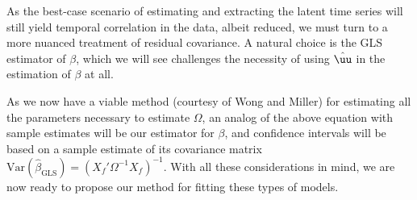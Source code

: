 As the best-case scenario of estimating and extracting the latent time series will still yield temporal correlation in the data, albeit reduced, we must turn to a more nuanced treatment of residual covariance. A natural choice is the GLS estimator of $\beta$, which we will see challenges the necessity of using $\hat{\uu}$ in the estimation of $\beta$ at all.



As we now have a viable method (courtesy of Wong and Miller) for estimating all the parameters necessary to estimate $\Omega$, an analog of the above equation with sample estimates will be our estimator for $\beta$, and confidence intervals will be based on a sample estimate of its covariance matrix $\text{Var}(\hat{\beta}_\text{GLS}) = (X_f'\Omega^{-1}X_f)^{-1}$. With all these considerations in mind, we are now ready to propose our method for fitting these types of models.
